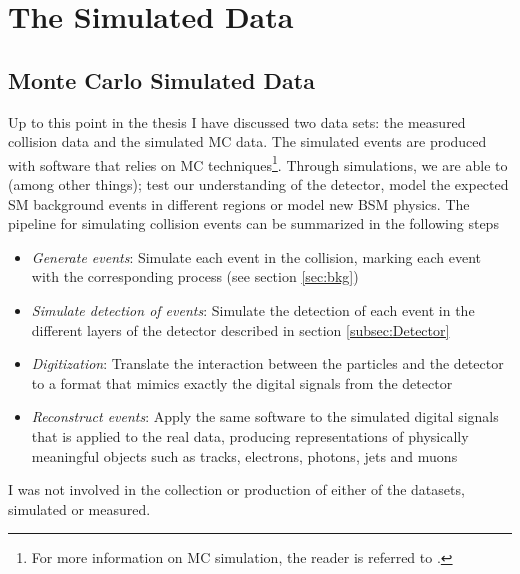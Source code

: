 \section{The Simulated Data}
\subsection{Monte Carlo Simulated Data}
Up to this point in the thesis I have discussed two data sets: the measured collision data and the simulated \ac{MC} data. 
The simulated events are produced with software that relies on \acf{MC} techniques\footnote{For 
more information on \ac{MC} simulation, the reader is referred to \cite{raychaudhuri_introduction_2008}.}.
Through simulations, we are able to (among other things); test our understanding of the detector, model the expected \ac{SM} background 
events in different regions or model new \ac{BSM} physics. The pipeline for simulating collision events can be summarized in the following steps
\begin{itemize}
  \item \emph{Generate events}: Simulate each event in the collision, marking each event with the corresponding process (see section \ref{sec:bkg})
  \item \emph{Simulate detection of events}: Simulate the detection of each event in the different layers of the detector described in section \ref{subsec:Detector}
  \item \emph{Digitization}: Translate the interaction between the particles and the detector to a format that mimics exactly the digital signals from the detector
  \item \emph{Reconstruct events}: Apply the same software to the simulated digital signals that is applied to the real data, producing representations of physically 
              meaningful objects such as tracks, electrons, photons, jets and muons
\end{itemize}
I was not involved in the collection or production of either of the datasets, simulated or measured.

